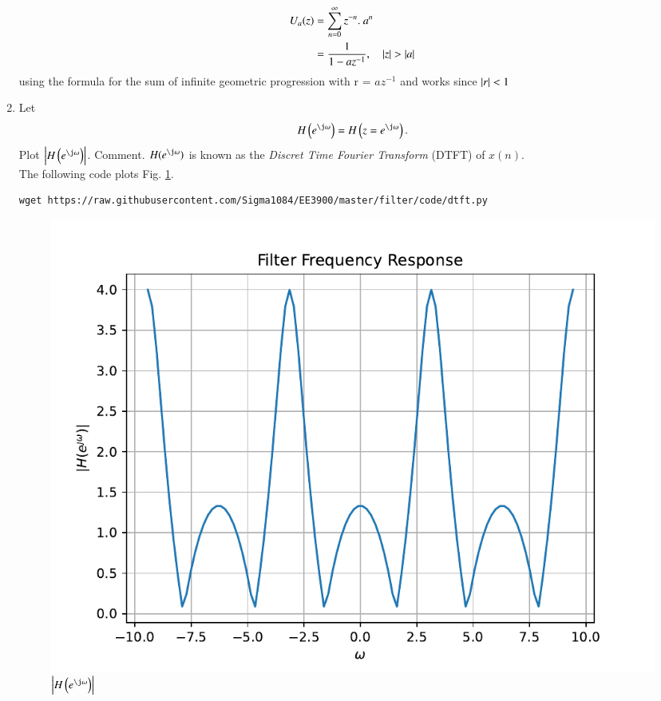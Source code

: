 \documentclass[journal,12pt,twocolumn]{IEEEtran}
\renewcommand\thesection{\arabic{section}}
\begin{document}
\begin{enumerate}[label=\thesection.\arabic*]
 \\
\begin{align}
U_a(z) & = \sum _{n= 0}^{\infty}z^{-n} . \ a^n
\\
&=\frac{1}{1-az^{-1}}, \quad \left \vert z\right\vert > \left \vert a\right\vert
\end{align}
using the formula for the sum of infinite geometric progression with r = $az^{-1}$ and works since $\left \vert r\right\vert < 1$
%

\item 
Let
\begin{equation}
H\brak{e^{\j \omega}} = H\brak{z = e^{\j \omega}}.
\end{equation}
Plot $\abs{H\brak{e^{\j \omega}}}$.  Comment.  $H(e^{\j \omega})$ is
known as the {\em Discret Time Fourier Transform} (DTFT) of $x(n)$.
\\
\solution The following code plots Fig. \ref{fig:dtft}.
\begin{lstlisting}
wget https://raw.githubusercontent.com/Sigma1084/EE3900/master/filter/code/dtft.py
\end{lstlisting}
\begin{figure}[!ht]
\centering
\includegraphics[width=\columnwidth]{./figs/dtft}
\caption{$\abs{H\brak{e^{\j\omega}}}$}
\label{fig:dtft}
\end{figure}
\end{enumerate}
\end{document}
